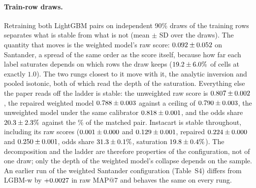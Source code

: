 \documentclass[sigconf,nonacm]{acmart}
\makeatletter
\newcommand{\Sm}{\textsf{LGBM-w}\xspace}
\newcommand{\mapseven}{\mathrm{MAP}@7\xspace}
\makeatother
\begin{document}
\paragraph{Train-row draws.} Retraining both LightGBM pairs on \nseedN{} independent 90\% draws of the training rows separates what is stable from what is not (mean $\pm$ SD over the draws). The quantity that moves is the weighted model's raw score: $0.092 \pm 0.052$ on Santander, a spread of the same order as the score itself, because how far each label saturates depends on which rows the draw keeps ($19.2 \pm 6.0\%$ of cells at exactly $1.0$). The two rungs closest to it move with it, the analytic inversion and pooled isotonic, both of which read the depth of the saturation. Everything else the paper reads off the ladder is stable: the unweighted raw score is $0.807 \pm 0.002$, the repaired weighted model $0.788 \pm 0.003$ against a ceiling of $0.790 \pm 0.003$, the unweighted model under the same calibrator $0.818 \pm 0.001$, and the odds share $20.3 \pm 2.3\%$ against the \noddsShare\% of the matched pair. Instacart is stable throughout, including its raw scores ($0.001 \pm 0.000$ and $0.129 \pm 0.001$, repaired $0.224 \pm 0.000$ and $0.250 \pm 0.001$, odds share $31.3 \pm 0.1\%$, saturation $19.8 \pm 0.4\%$). The decomposition and the ladder are therefore properties of the configuration, not of one draw; only the depth of the weighted model's collapse depends on the sample. An earlier run of the weighted Santander configuration (Table~S4) differs from \Sm by $+0.0027$ in raw $\mapseven$ and behaves the same on every rung.



\end{document}
